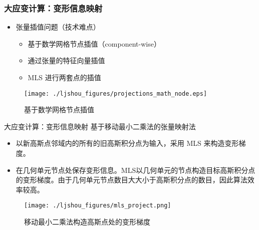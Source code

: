 \documentclass[mathserif]{beamer}
\begin{document}
\begin{CJK}{UTF8}{gkai}
\begin{frame}
    	\frametitle{大应变计算：变形信息映射}	
    	\begin{itemize}
    		\item 张量插值问题（技术难点）
    		\begin{itemize}
    			\item 基于数学网格节点插值（component-wise）
    			\item 通过张量的特征向量插值
    			\item MLS 进行两套点的插值
    		\end{itemize}
    	\end{itemize}
    	\begin{figure}
    		\centering
    		\texttt{[image: ./ljshou\_figures/projections\_math\_node.eps]}
    		\caption{基于数学网格节点插值}
    	\end{figure}
    \end{frame}
    
    \begin{frame}{大应变计算：变形信息映射}
        基于移动最小二乘法的张量映射法
        \begin{itemize}
        \item 以新高斯点邻域内的所有的旧高斯积分点为输入，采用 MLS 来构造变形梯度。
        \item 在几何单元节点处保存变形信息。MLS以几何单元的节点构造目标高斯积分点的变形梯度。由于几何单元节点数目大大小于高斯积分点的数目，因此算法效率较高。
        \end{itemize}
        \begin{figure}
    		\centering
    		\texttt{[image: ./ljshou\_figures/mls\_project.png]}
    		\caption{移动最小二乘法构造高斯点处的变形梯度}
    	\end{figure}
    \end{frame}



\end{CJK}
\end{document}
